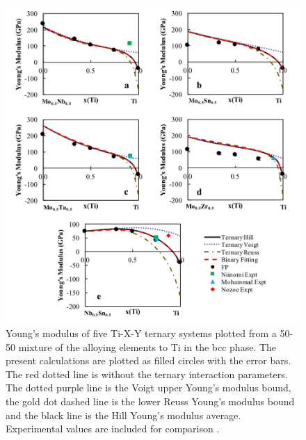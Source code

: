 \pagebreak
\begin{figure}[H]
	\centering
	\includegraphics[width=\textwidth]{Chapter-6/Figures/tixyyoungs1.png}
	\caption{Young's modulus of five Ti-X-Y ternary systems plotted from a 50-50 mixture of the alloying elements to Ti in the bcc phase. The present calculations are plotted as filled circles with the error bars. The red dotted line is without the ternary interaction parameters. The dotted purple line is the Voigt upper Young's modulus bound, the gold dot dashed line is the lower Reuss Young's modulus bound and the black line is the Hill Young's modulus average. Experimental values are included for comparison \cite{Niinomi2012,Mohammed2014,Nozoe2007,Geetha2009}.}
	\label{Ch6-figure:tixyyoungs1}
\end{figure}

